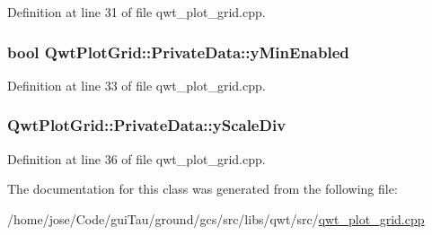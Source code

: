 Definition at line 31 of file qwt\-\_\-plot\-\_\-grid.\-cpp.

\hypertarget{class_qwt_plot_grid_1_1_private_data_aab01ee1677da7d439792d4408564aa64}{
\subsubsection[{y\-Min\-Enabled}]{\setlength{\rightskip}{0pt plus 5cm}bool Qwt\-Plot\-Grid\-::\-Private\-Data\-::y\-Min\-Enabled}}\label{class_qwt_plot_grid_1_1_private_data_aab01ee1677da7d439792d4408564aa64}


Definition at line 33 of file qwt\-\_\-plot\-\_\-grid.\-cpp.

\hypertarget{class_qwt_plot_grid_1_1_private_data_a878c13ccbecec7a5b6a5ee0cffe56afd}{
\subsubsection[{y\-Scale\-Div}]{ Qwt\-Plot\-Grid\-::\-Private\-Data\-::y\-Scale\-Div}}\label{class_qwt_plot_grid_1_1_private_data_a878c13ccbecec7a5b6a5ee0cffe56afd}


Definition at line 36 of file qwt\-\_\-plot\-\_\-grid.\-cpp.



The documentation for this class was generated from the following file\-:\begin{DoxyCompactItemize}
\item 
/home/jose/\-Code/gui\-Tau/ground/gcs/src/libs/qwt/src/\hyperlink{qwt__plot__grid_8cpp}{qwt\-\_\-plot\-\_\-grid.\-cpp}\end{DoxyCompactItemize}
